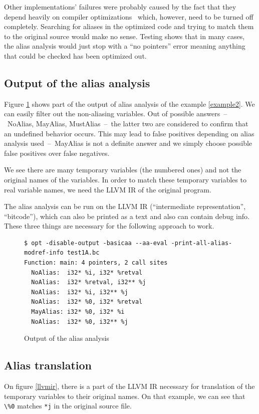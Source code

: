 Other implementations' failures were probably caused by the fact that they depend heavily on compiler optimizations~\cite{alias-analysis-optimizations} which, however, need to be turned off completely. Searching for aliases in the optimized code and trying to match them to the original source would make no sense. Testing shows that in many cases, the alias analysis would just stop with a ``no pointers'' error meaning anything that could be checked has been optimized out.

\subsection{Output of the alias analysis}
Figure \ref{alias-output} shows part of the output of alias analysis of the example \ref{example2}. We can easily filter out the non-aliasing variables. Out of possible answers~--~NoAlias, MayAlias, MustAlias~--~the latter two are considered to confirm that an undefined behavior occurs. This may lead to false positives depending on alias analysis used~--~MayAlias is not a definite answer and we simply choose possible false positives over false negatives.

We see there are many temporary variables (the numbered ones) and not the original names of the variables. In order to match these temporary variables to real variable names, we need the LLVM IR of the original program.

The alias analysis can be run on the LLVM IR (``intermediate representation'', ``bitcode''), which can also be printed as a text and also can contain debug info. These three things are necessary for the following approach to work.
\begin{figure}
\caption{Output of the alias analysis}
\label{alias-output}
\begin{lstlisting}
$ opt -disable-output -basicaa --aa-eval -print-all-alias-modref-info test1A.bc 
Function: main: 4 pointers, 2 call sites
  NoAlias:	i32* %i, i32* %retval
  NoAlias:	i32* %retval, i32** %j
  NoAlias:	i32* %i, i32** %j
  NoAlias:	i32* %0, i32* %retval
  MayAlias:	i32* %0, i32* %i
  NoAlias:	i32* %0, i32** %j
\end{lstlisting}
\end{figure}

\subsection{Alias translation}
On figure \ref{llvmir}, there is a part of the LLVM IR necessary for translation of the temporary variables to their original names. On that example, we can see that \verb|\%0| matches \verb|*j| in the original source file.

